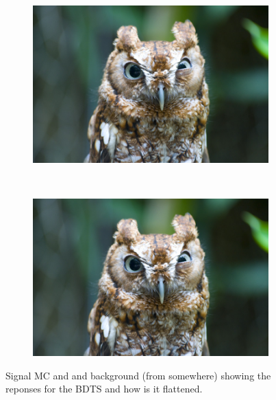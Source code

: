 \begin{figure}
    \centering
    \begin{subfigure}[b]{0.4\textwidth}
        \includegraphics[width=\textwidth]{./Figs/placeholder.jpeg}
        \caption{ }
        \label{fig:BDTSsig}
    \end{subfigure}
    ~ %
    \begin{subfigure}[b]{0.4\textwidth}
       \includegraphics[width=\textwidth]{./Figs/placeholder.jpeg}
        \caption{ }
        \label{fig:BDTSbkg}
    \end{subfigure}
    \caption{Signal MC and and background (from somewhere) showing the reponses for the BDTS and how is it flattened.}
    \label{fig:FlatteningBDTS}
\end{figure}

